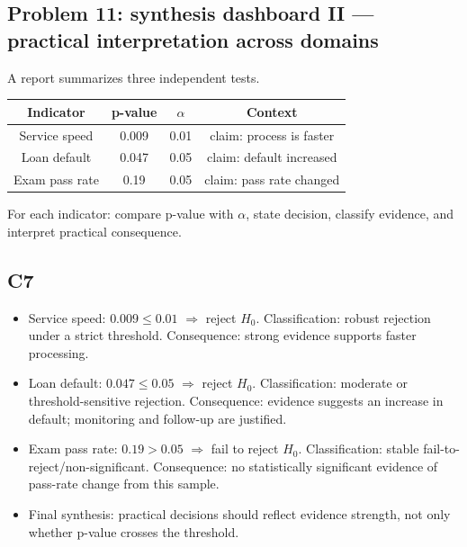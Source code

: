 \begin{ExamProblems}
\item
\section{Problem 11: synthesis dashboard II --- practical interpretation across domains}
A report summarizes three independent tests.

\begin{center}
\begin{tabular}{|c|c|c|c|}
\hline
Indicator & p-value & \(\alpha\) & Context \\
\hline
Service speed & 0.009 & 0.01 & claim: process is faster \\
Loan default & 0.047 & 0.05 & claim: default increased \\
Exam pass rate & 0.19 & 0.05 & claim: pass rate changed \\
\hline
\end{tabular}
\end{center}

For each indicator: compare p-value with \(\alpha\), state decision, classify evidence, and interpret practical consequence.

\subsection*{C7}
\begin{itemize}
    \item Service speed: \(0.009\le 0.01\) \(\Rightarrow\) reject \(H_0\). Classification: robust rejection under a strict threshold. Consequence: strong evidence supports faster processing.
    \item Loan default: \(0.047\le 0.05\) \(\Rightarrow\) reject \(H_0\). Classification: moderate or threshold-sensitive rejection. Consequence: evidence suggests an increase in default; monitoring and follow-up are justified.
    \item Exam pass rate: \(0.19>0.05\) \(\Rightarrow\) fail to reject \(H_0\). Classification: stable fail-to-reject/non-significant. Consequence: no statistically significant evidence of pass-rate change from this sample.
    \item Final synthesis: practical decisions should reflect evidence strength, not only whether p-value crosses the threshold.
\end{itemize}

\end{ExamProblems}

